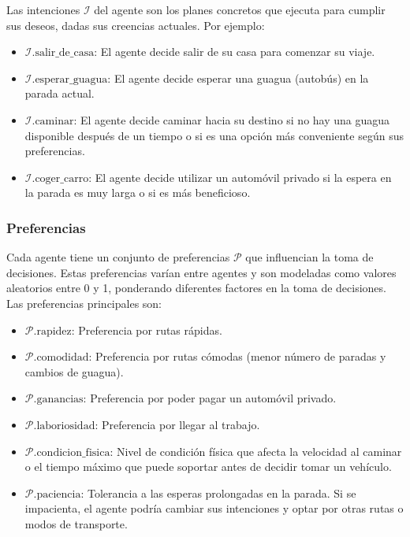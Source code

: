 \documentclass[a4paper,12pt]{article}
\begin{document}
Las intenciones $\mathcal{I}$ del agente son los planes concretos que ejecuta para cumplir sus deseos, dadas sus creencias actuales. Por ejemplo:

\begin{itemize}
    \item $\mathcal{I}.\text{salir\_de\_casa}$: El agente decide salir de su casa para comenzar su viaje.
    \item $\mathcal{I}.\text{esperar\_guagua}$: El agente decide esperar una guagua (autobús) en la parada actual.
    \item $\mathcal{I}.\text{caminar}$: El agente decide caminar hacia su destino si no hay una guagua disponible despu\'es de un tiempo o si es una opción más conveniente según sus preferencias.
    \item $\mathcal{I}.\text{coger\_carro}$: El agente decide utilizar un automóvil privado si la espera en la parada es muy larga o si es más beneficioso.
\end{itemize}

\subsubsection{Preferencias}

Cada agente tiene un conjunto de preferencias $\mathcal{P}$ que influencian la toma de decisiones. Estas preferencias varían entre agentes y son modeladas como valores aleatorios entre 0 y 1, ponderando diferentes factores en la toma de decisiones. Las preferencias principales son:

\begin{itemize}
    \item $\mathcal{P}.\text{rapidez}$: Preferencia por rutas rápidas.
    \item $\mathcal{P}.\text{comodidad}$: Preferencia por rutas cómodas (menor número de paradas y cambios de guagua).
    \item $\mathcal{P}.\text{ganancias}$: Preferencia por poder pagar un autom\'ovil privado.
    \item $\mathcal{P}.\text{laboriosidad}$: Preferencia por llegar al trabajo.
    \item $\mathcal{P}.\text{condicion\_fisica}$: Nivel de condición física que afecta la velocidad al caminar o el tiempo máximo que puede soportar antes de decidir tomar un vehículo.
    \item $\mathcal{P}.\text{paciencia}$: Tolerancia a las esperas prolongadas en la parada. Si se impacienta, el agente podría cambiar sus intenciones y optar por otras rutas o modos de transporte.
\end{itemize}
\end{document}
